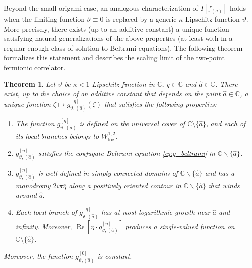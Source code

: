 \documentclass[reqno]{amsart}
\numberwithin{equation}{section}
\newtheorem{theo}{Theorem}[section]
\theoremstyle{definition}
\theoremstyle{remark}
\renewcommand\Re{\operatorname{Re}}
\begin{document}
Beyond the small origami case, an analogous characterization of $I[f_{(a)}]$ holds when the limiting function $\vartheta \equiv 0$ is replaced by a generic $\kappa$-Lipschitz function $\vartheta$. More precisely, there exists (up to an additive constant) a unique function satisfying natural generalizations of the above properties (at least with in a regular enough class of solution to Beltrami equations). The following theorem formalizes this statement and describes the scaling limit of the two-point fermionic correlator.
\begin{theo}\label{thm:existence-generalised-log}
	Let $\vartheta$ be $\kappa<1$-Lipschitz function in $\mathbb{C}$, $\eta \in \mathbb{C}$ and $\hat{a}\in \mathbb{C}$. There exist, up to the choice of an additive constant that depends on the point $\hat{a}\in \mathbb{C}$, a unique fonction  $\zeta \mapsto g^{[\eta]}_{\vartheta,(\hat{a})}(\zeta) $ that satisfies the following properties:
	\begin{enumerate}
	\item The function \(g^{[\eta]}_{\vartheta,(\hat{a})}\) is defined on the universal cover of $\mathbb C\setminus\{\hat{a}\}$, and each of its local branches belongs to $W^{1,2}_{\mathrm{loc}}$.
		\item $g^{[\eta]}_{\vartheta,(\hat{a})}$ satisfies the conjugate Beltrami equation \eqref{eq:g_beltrami} in $\mathbb{C} \backslash \{ \hat{a} \} $.
		\item $g^{[\eta]}_{\vartheta,(\hat{a})}$ is well defined in simply connected domains of $ \mathbb{C}\backslash \{\hat{a}\}$ and has a monodromy $2i\pi \overline{\eta}$ along a positively oriented contour in $ \mathbb{C}\backslash \{\hat{a}\}$ that winds around $\hat{a}$.
		\item Each local branch of $g^{[\eta]}_{\vartheta,(\hat{a})}$ has at most logarithmic growth near $\hat{a}$ and  infinity. Moreover, $\Re[\eta \cdot g^{[\eta]}_{\vartheta,(\hat{a})}]$ produces a single-valued function on $\mathbb C\setminus\{\hat{a}\}$.	\end{enumerate}
Moreover, the function $g^{[0]}_{\vartheta,(\hat{a})}$ is constant.
	\end{theo}	
\end{document}
